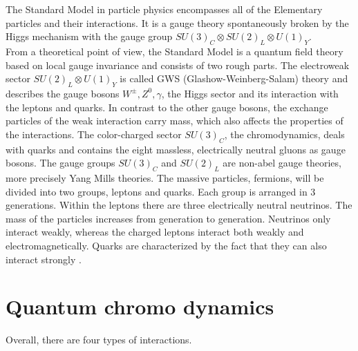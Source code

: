 The Standard Model in particle physics encompasses all of the
Elementary particles and their interactions. It is a gauge theory spontaneously broken by the Higgs mechanism with the gauge group $ SU(3)_C \otimes SU(2)_L \otimes U(1)_Y $.\\
From a theoretical point of view, the Standard Model is a quantum field theory based on local gauge invariance and consists of two rough parts. The electroweak sector $ SU(2)_L \otimes U(1)_Y $ is called GWS (Glashow-Weinberg-Salam) theory and describes the gauge bosons $ W^{\pm}, Z^0, \gamma $, the Higgs sector and its interaction with the leptons and quarks. In contrast to the other gauge bosons, the exchange particles of the weak interaction carry mass, which also affects the properties of the interactions. The color-charged sector $ SU(3)_C $, the chromodynamics, deals with quarks and contains the eight massless, electrically neutral gluons as gauge bosons. The gauge groups $SU(3)_C$ and $SU(2)_L$ are non-abel gauge theories, more precisely Yang Mills theories.
The massive particles, fermions, will be divided into two groups, leptons and quarks. Each group is arranged in 3 generations. Within the leptons there are three electrically neutral neutrinos. The mass of the particles increases from generation to generation. Neutrinos only interact weakly, whereas the charged leptons interact both weakly and electromagnetically. Quarks are characterized by the fact that they can also interact strongly \cite{edelhaeuser2016tutorium}. 

\section{Quantum chromo dynamics}

Overall, there are four types of interactions.\\



